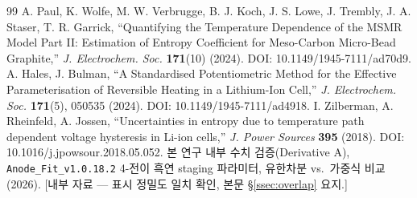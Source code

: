 \documentclass[11pt,a4paper]{article}
\begin{document}
\begin{thebibliography}{99}
 A. Paul, K. Wolfe, M. W. Verbrugge, B. J. Koch, J. S. Lowe, J. Trembly, J. A. Staser, T. R. Garrick, ``Quantifying the Temperature Dependence of the MSMR Model Part II: Estimation of Entropy Coefficient for Meso-Carbon Micro-Bead Graphite,'' \emph{J. Electrochem. Soc.} \textbf{171}(10) (2024). DOI: 10.1149/1945-7111/ad70d9.
 A. Hales, J. Bulman, ``A Standardised Potentiometric Method for the Effective Parameterisation of Reversible Heating in a Lithium-Ion Cell,'' \emph{J. Electrochem. Soc.} \textbf{171}(5), 050535 (2024). DOI: 10.1149/1945-7111/ad4918.
 I. Zilberman, A. Rheinfeld, A. Jossen, ``Uncertainties in entropy due to temperature path dependent voltage hysteresis in Li-ion cells,'' \emph{J. Power Sources} \textbf{395} (2018). DOI: 10.1016/j.jpowsour.2018.05.052.
 본 연구 내부 수치 검증(Derivative A), \texttt{Anode\_Fit\_v1.0.18.2} 4-전이 흑연 staging 파라미터, 유한차분 vs.\ 가중식 비교 (2026). [내부 자료 — 표시 정밀도 일치 확인, 본문 \S\ref{ssec:overlap} 요지.]
\end{thebibliography}
\end{document}
